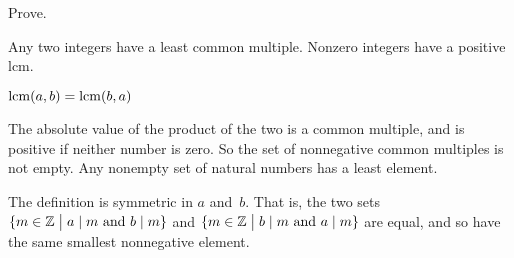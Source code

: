 \documentclass{ibl}  %
\begin{document}
\begin{ex} Prove.
\begin{exes}
\item {} Any two integers have a least common multiple.
  Nonzero integers have a positive lcm.
\item {} $\operatorname{lcm}(a,b)=\operatorname{lcm}(b,a)$
\end{exes}
\begin{ans}
\begin{exes}
\item The absolute value of the product of the two is a common multiple,
  and is positive if neither number is zero.
  So the set of nonnegative common multiples is not empty.
  Any nonempty set of natural numbers has a least element.
\item The definition is symmetric in $a$ and~$b$.
  That is, the two sets
  $\{m\in\mathbb{Z} \bigm| \text{$a\mid m$ and $b\mid m$}\}$
  and     
  $\{m\in\mathbb{Z} \bigm| \text{$b\mid m$ and $a\mid m$}\}$
  are equal, and so have the same smallest nonnegative element.
\end{exes}
\end{ans}
\end{ex}
\end{document}
